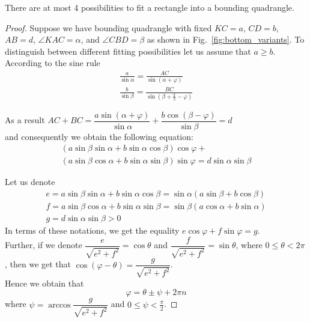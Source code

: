 \documentclass[graybox]{svmult}
\begin{document}
\begin{theorem}
\label{th:restriction}
There are at most 4 possibilities to fit  a rectangle into a bounding quadrangle.
\end{theorem}
\begin{proof}
Suppose we have bounding quadrangle with fixed $KC = a$, $CD = b$, $AB = d$, $\angle KAC = \alpha$, and $\angle CBD = \beta $ as shown in Fig.~\ref{fig:bottom_variants}. To distinguish between different fitting possibilities let us assume that $a \geq b$.
According to the sine rule
\begin{gather*} 
\frac{a}{\sin{\alpha}} = \frac{AC}{\sin{(\alpha + \varphi)}}\\ 
\frac{b}{\sin{\beta}} = \frac{BC}{\sin{(\beta + \frac{\pi}{2}- \varphi)}}
\end{gather*}

As a result $ AC + BC =  \dfrac{a\sin{(\alpha + \varphi)}}{\sin{\alpha}} + \dfrac{b \cos{(\beta - \varphi)}}{\sin{\beta}} = d$ \\
and consequently we obtain the following equation:
\begin{multline}\label{sin_eq}
(a \sin \beta \sin \alpha + b \sin \alpha \cos \beta) \cos \varphi + \\
(a \sin \beta \cos \alpha + b \sin \alpha \sin \beta) \sin \varphi = d \sin \alpha \sin \beta
\end{multline}


Let us denote
\begin{gather*}
e = a \sin \beta \sin \alpha + b \sin \alpha \cos \beta = \sin \alpha ( a \sin \beta + b \cos \beta)\\ 
 f = a \sin \beta \cos \alpha + b \sin \alpha \sin \beta = \sin \beta ( a \cos \alpha + b \sin \alpha)\\
 g = d \sin \alpha \sin \beta > 0
\end{gather*}
In terms of these notations, we get the equality $e \cos \varphi + f \sin \varphi = g$.\\
Further, if we denote $\dfrac{e}{\sqrt{e^2 + f^2}} = \cos \theta$ and $\dfrac{f}{\sqrt{e^2 + f^2}} = \sin \theta$, where $0 \leq \theta < 2 \pi$
, then we get that $\cos{(\varphi - \theta)} = \dfrac{g}{\sqrt{e^2 + f^2}}$.\\
Hence we obtain that 
\begin{equation} \label{eq:phi}
\varphi = \theta \pm \psi + 2 \pi n
\end{equation}
where $\psi = \arccos{\dfrac{g}{\sqrt{e^2 + f^2}}}$ and $0 \leq \psi < \frac{\pi}{2}$.
\end{proof}
\end{document}
